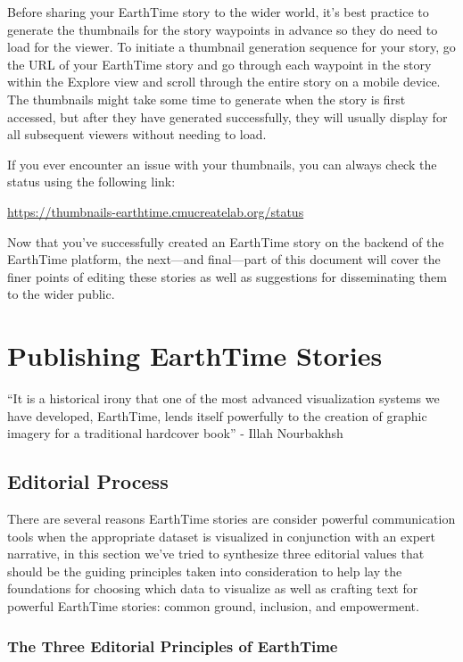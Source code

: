 \documentclass[
]{book}
\begin{document}
Before sharing your EarthTime story to the wider world, it's best practice to generate the thumbnails for the story waypoints in advance so they do need to load for the viewer. To initiate a thumbnail generation sequence for your story, go the URL of your EarthTime story and go through each waypoint in the story within the Explore view and scroll through the entire story on a mobile device. The thumbnails might take some time to generate when the story is first accessed, but after they have generated successfully, they will usually display for all subsequent viewers without needing to load.

If you ever encounter an issue with your thumbnails, you can always check the status using the following link:

\url{https://thumbnails-earthtime.cmucreatelab.org/status}

Now that you've successfully created an EarthTime story on the backend of the EarthTime platform, the next---and final---part of this document will cover the finer points of editing these stories as well as suggestions for disseminating them to the wider public.

\hypertarget{part-publishing-earthtime-stories}{%
\part{Publishing EarthTime Stories}\label{part-publishing-earthtime-stories}}

``It is a historical irony that one of the most advanced visualization systems we have developed, EarthTime, lends itself powerfully to the creation of graphic imagery for a traditional hardcover book'' - Illah Nourbakhsh

\hypertarget{editorial-process}{%
\chapter{Editorial Process}\label{editorial-process}}

There are several reasons EarthTime stories are consider powerful communication tools when the appropriate dataset is visualized in conjunction with an expert narrative, in this section we've tried to synthesize three editorial values that should be the guiding principles taken into consideration to help lay the foundations for choosing which data to visualize as well as crafting text for powerful EarthTime stories: common ground, inclusion, and empowerment.

\hypertarget{the-three-editorial-principles-of-earthtime}{%
\section{The Three Editorial Principles of EarthTime}\label{the-three-editorial-principles-of-earthtime}}
\end{document}
